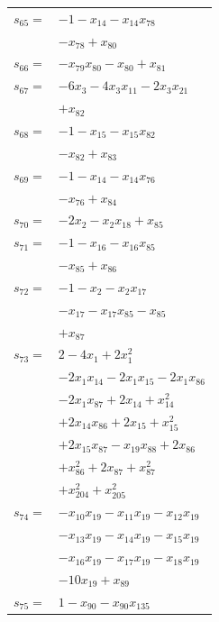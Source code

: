 \begin{longtable}{@{}r@{\;}l@{}}
\(s_{65}=\) & \(\displaystyle -1 -x_{14} -x_{14}x_{78}\) \\
 & \(\displaystyle -x_{78} +x_{80}\) \\[3pt]
\(s_{66}=\) & \(\displaystyle -x_{79}x_{80} -x_{80} +x_{81}\) \\[3pt]
\(s_{67}=\) & \(\displaystyle -6x_{3} -4x_{3}x_{11} -2x_{3}x_{21}\) \\
 & \(\displaystyle +x_{82}\) \\[3pt]
\(s_{68}=\) & \(\displaystyle -1 -x_{15} -x_{15}x_{82}\) \\
 & \(\displaystyle -x_{82} +x_{83}\) \\[3pt]
\(s_{69}=\) & \(\displaystyle -1 -x_{14} -x_{14}x_{76}\) \\
 & \(\displaystyle -x_{76} +x_{84}\) \\[3pt]
\(s_{70}=\) & \(\displaystyle -2x_{2} -x_{2}x_{18} +x_{85}\) \\[3pt]
\(s_{71}=\) & \(\displaystyle -1 -x_{16} -x_{16}x_{85}\) \\
 & \(\displaystyle -x_{85} +x_{86}\) \\[3pt]
\(s_{72}=\) & \(\displaystyle -1 -x_{2} -x_{2}x_{17}\) \\
 & \(\displaystyle -x_{17} -x_{17}x_{85} -x_{85}\) \\
 & \(\displaystyle +x_{87}\) \\[3pt]
\(s_{73}=\) & \(\displaystyle 2 -4x_{1} +2x_{1}^{2}\) \\
 & \(\displaystyle -2x_{1}x_{14} -2x_{1}x_{15} -2x_{1}x_{86}\) \\
 & \(\displaystyle -2x_{1}x_{87} +2x_{14} +x_{14}^{2}\) \\
 & \(\displaystyle +2x_{14}x_{86} +2x_{15} +x_{15}^{2}\) \\
 & \(\displaystyle +2x_{15}x_{87} -x_{19}x_{88} +2x_{86}\) \\
 & \(\displaystyle +x_{86}^{2} +2x_{87} +x_{87}^{2}\) \\
 & \(\displaystyle +x_{204}^{2} +x_{205}^{2}\) \\[3pt]
\(s_{74}=\) & \(\displaystyle -x_{10}x_{19} -x_{11}x_{19} -x_{12}x_{19}\) \\
 & \(\displaystyle -x_{13}x_{19} -x_{14}x_{19} -x_{15}x_{19}\) \\
 & \(\displaystyle -x_{16}x_{19} -x_{17}x_{19} -x_{18}x_{19}\) \\
 & \(\displaystyle -10x_{19} +x_{89}\) \\[3pt]
\(s_{75}=\) & \(\displaystyle 1 -x_{90} -x_{90}x_{135}\) \\

\end{longtable}
